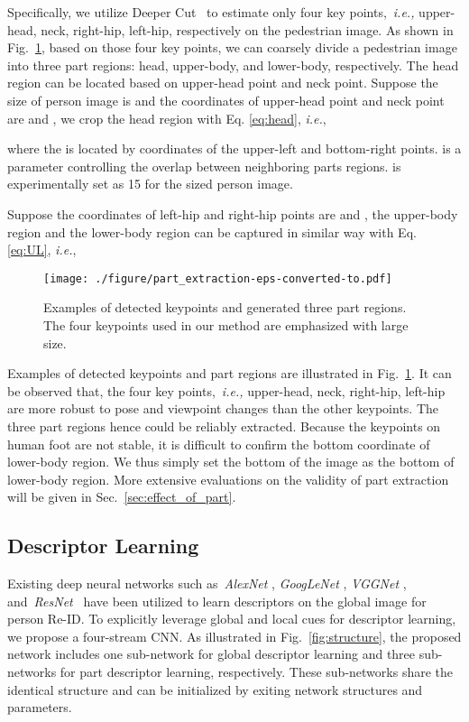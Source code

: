 \documentclass[sigconf]{acmart}
\begin{document}
Specifically, we utilize Deeper Cut~\cite{DeeperCut} to estimate only four key points,~\emph{i.e.,} upper-head, neck, right-hip, left-hip, respectively on the pedestrian image. As shown in Fig.~\ref{fig:part_extraction}, based on those four key points, we can coarsely divide a pedestrian image into three part regions: head, upper-body, and lower-body, respectively. The head region can be located based on upper-head point and neck point. Suppose the size of person image is  and the coordinates of upper-head point and neck point are  and , we crop the head region  with Eq. \eqref{eq:head}, \emph{i.e.},

where the  is located by coordinates of the upper-left and bottom-right points.  is a parameter controlling the overlap between neighboring parts regions.  is experimentally set as 15 for the  sized person image.

Suppose the coordinates of left-hip and right-hip points are  and , the upper-body region  and the lower-body region  can be captured in similar way with Eq. \eqref{eq:UL}, \emph{i.e.},


\begin{figure}
\begin{center}
\texttt{[image: ./figure/part\_extraction-eps-converted-to.pdf]}
\end{center}
\caption{Examples of detected keypoints and generated three part regions. The four keypoints used in our method are emphasized with large size.}
\label{fig:part_extraction}
\end{figure}

Examples of detected keypoints and part regions are illustrated in Fig.~\ref{fig:part_extraction}. It can be observed that, the four key points,~\emph{i.e.,} upper-head, neck, right-hip, left-hip are more robust to pose and viewpoint changes than the other keypoints. The three part regions hence could be reliably extracted. Because the keypoints on human foot are not stable, it is difficult to confirm the bottom coordinate of lower-body region. We thus simply set the bottom of the image as the bottom of lower-body region. More extensive evaluations on the validity of part extraction will be given in Sec.~\ref{sec:effect_of_part}.

\subsection{Descriptor Learning}

Existing deep neural networks such as~\emph{AlexNet} \cite{alexnet}, \emph{GoogLeNet} \cite{googlenet}, \emph{VGGNet} \cite{VGGnet}, and~\emph{ResNet}~\cite{resnet} have been utilized to learn descriptors on
the global image for person Re-ID. To explicitly leverage global and local cues for descriptor learning,
we propose a four-stream CNN. As illustrated in Fig.~\ref{fig:structure}, the proposed network includes one sub-network for global descriptor learning and three sub-networks for part descriptor learning, respectively. These sub-networks share the identical structure and can be initialized by exiting network structures and parameters.
\end{document}
